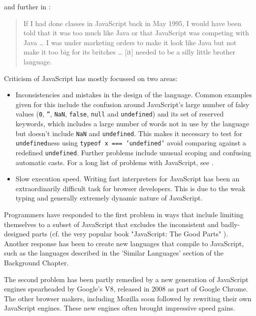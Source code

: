 \documentclass[11pt]{report}
\begin{document}
and further in \cite{comparticle}:

\begin{quote}
If I had done classes in JavaScript back in May 1995, I would have been told that it was too much like Java or that JavaScript was competing with Java … I was under marketing orders to make it look like Java but not make it too big for its britches … [it] needed to be a silly little brother language.
\end{quote}


Criticism of JavaScript has mostly focussed on two areas:
\begin{itemize}
\item Inconsistencies and mistakes in the design of the language. Common examples given for this include the confusion around JavaScript's large number of falsy values (\texttt{0},  \texttt{''}, \texttt{NaN}, \texttt{false}, \texttt{null} and \texttt{undefined}) and its set of reserved keywords, which includes a large number of words not in use by the language but doesn't include \texttt{NaN} and \texttt{undefined}. This makes it necessary to test for \texttt{undefined}ness using \mbox{\texttt{typeof x === 'undefined'}} avoid comparing against a redefined \texttt{undefined}. Further problems include unusual scoping and confusing automatic casts. For a long list of problems with JavaScript, see \cite{jsgoodparts}.
\item Slow execution speed. Writing fast interpreters for JavaScript has been an extraordinarily difficult task for browser developers. This is due to the weak typing and generally extremely dynamic nature of JavaScript.
\end{itemize}

Programmers have responded to the first problem in ways that include limiting themselves to a subset of JavaScript that excludes the inconsistent and badly-designed parts (cf. the very popular book "JavaScript: The Good Parts" \cite{jsgoodparts}). Another response has been to create new languages that compile to JavaScript, such as the languages described in the 'Similar Languages' section of the Background Chapter.

The second problem has been partly remedied by a new generation of JavaScript engines spearheaded by Google's V8, released in 2008 as part of Google Chrome. The other browser makers, including Mozilla soon followed by rewriting their own JavaScript engines. These new engines often brought impressive speed gains.
\end{document}
